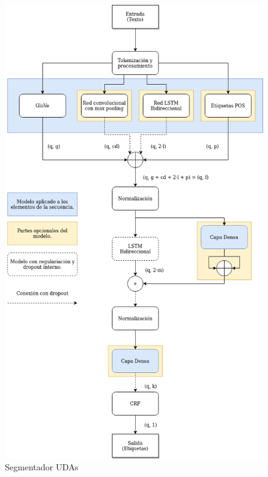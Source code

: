 \begin{figure}[h!]
	\begin{center}
		\begin{center}
			\includegraphics[scale=.3]{Graphics/Modelo_Segmenter_UDA.png}
        \end{center}
	    \caption{Segmentador UDAs}\label{fig:seg_uda}
	\end{center}
\end{figure}

